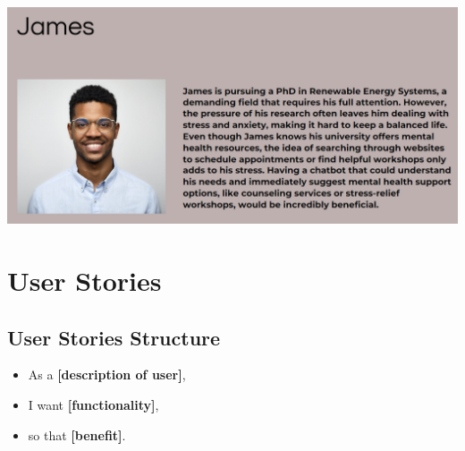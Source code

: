 \documentclass{l4proj}
\begin{document}
\begin{appendices}
\vspace{-10pt} 

\noindent\begin{minipage}{\linewidth}
    \centering
    \includegraphics[width=\linewidth]{images/james.png}
\end{minipage}

\chapter{User Stories}
\label{ch:User Stories}


\section*{User Stories Structure}
\begin{itemize}
    \item[] {\large As a \textbf{[description of user]},}
    \item[] {\large I want \textbf{[functionality]},}
    \item[] {\large so that \textbf{[benefit]}.}
\end{itemize}


\end{appendices}
\end{document}
